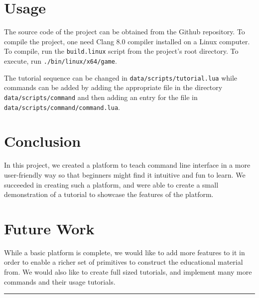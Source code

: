 \documentclass[a4paper]{article}
\begin{document}
\section{Usage}
The source code of the project can be obtained from the Github \cite{github} repository. To compile the project, one need Clang 8.0 compiler installed on a Linux computer. To compile, run the \texttt{build.linux} script from the project's root directory. To execute, run \texttt{./bin/linux/x64/game}.

The tutorial sequence can be changed in \texttt{data/scripts/tutorial.lua} while commands can be added by adding the appropriate file in the directory \texttt{data/scripts/command} and then adding an entry for the file in \texttt{data/scripts/command/command.lua}.

\section{Conclusion}
In this project, we created a platform to teach command line interface in a more user-friendly way so that beginners might find it intuitive and fun to learn. We succeeded in creating such a platform, and were able to create a small demonstration of a tutorial to showcase the features of the platform.

\section{Future Work}
While a basic platform is complete, we would like to add more features to it in order to enable a richer set of primitives to construct the educational material from. We would also like to create full sized tutorials, and implement many more commands and their usage tutorials.

\vspace{10cm}
\noindent\rule[0.25\baselineskip]{\textwidth}{1pt}






\end{document}
